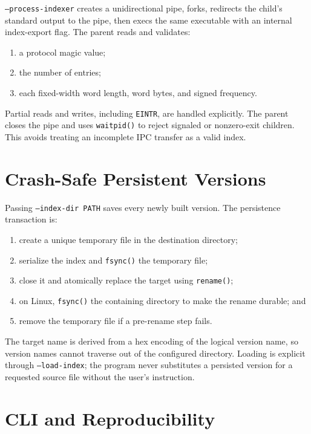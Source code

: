 \documentclass[11pt]{article}
\begin{document}
\texttt{--process-indexer} creates a unidirectional pipe, forks, redirects the
child's standard output to the pipe, then execs the same executable with an
internal index-export flag. The parent reads and validates:

\begin{enumerate}[noitemsep]
  \item a protocol magic value;
  \item the number of entries;
  \item each fixed-width word length, word bytes, and signed frequency.
\end{enumerate}

Partial reads and writes, including \texttt{EINTR}, are handled explicitly.
The parent closes the pipe and uses \texttt{waitpid()} to reject signaled or
nonzero-exit children. This avoids treating an incomplete IPC transfer as a
valid index.

\section{Crash-Safe Persistent Versions}

Passing \texttt{--index-dir PATH} saves every newly built version. The
persistence transaction is:

\begin{enumerate}[noitemsep]
  \item create a unique temporary file in the destination directory;
  \item serialize the index and \texttt{fsync()} the temporary file;
  \item close it and atomically replace the target using \texttt{rename()};
  \item on Linux, \texttt{fsync()} the containing directory to make the rename
        durable; and
  \item remove the temporary file if a pre-rename step fails.
\end{enumerate}

The target name is derived from a hex encoding of the logical version name, so
version names cannot traverse out of the configured directory. Loading is
explicit through \texttt{--load-index}; the program never substitutes a
persisted version for a requested source file without the user's instruction.

\section{CLI and Reproducibility}
\end{document}
